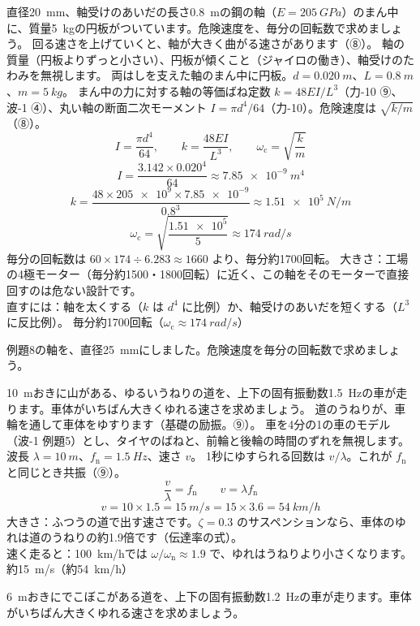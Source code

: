 \label{ph:波-2:ex8}
\begin{phreidai}[回る軸の危険速度]
直径\qty{20}{mm}、軸受けのあいだの長さ\qty{0.8}{m}の鋼の軸（$E=\qty{205}{GPa}$）のまん中に、質量\qty{5}{kg}の円板がついています。危険速度を、毎分の回転数で求めましょう。
\phbamen
回る速さを上げていくと、軸が大きく曲がる速さがあります（⑧）。
\phmushi
軸の質量（円板よりずっと小さい）、円板が傾くこと（ジャイロの働き）、軸受けのたわみを無視します。
\phzu
両はしを支えた軸のまん中に円板。$d=\qty{0.020}{m}$、$L=\qty{0.8}{m}$、$m=\qty{5}{kg}$。
\phriyu
まん中の力に対する軸の等価ばね定数 $k=48EI/L^3$（力-10 ⑨、波-1 ④）、丸い軸の断面二次モーメント $I=\pi d^4/64$（力-10）。危険速度は $\sqrt{k/m}$（⑧）。
\phtateru
\[I=\frac{\pi d^4}{64},\qquad k=\frac{48EI}{L^3},\qquad \omega_{\mathrm c}=\sqrt{\frac{k}{m}}\]
\phtoku
\[I=\frac{3.142\times0.020^4}{64}\approx\qty{7.85e-9}{m^4}\]
\[k=\frac{48\times\num{205e9}\times\num{7.85e-9}}{0.8^3}\approx\qty{1.51e5}{N/m}\]
\[\omega_{\mathrm c}=\sqrt{\frac{\num{1.51e5}}{5}}\approx\qty{174}{rad/s}\]
毎分の回転数は $60\times174\div6.283\approx1660$ より、毎分約1700回転。
\phtashikame
大きさ：工場の4極モーター（毎分約1500・1800回転）に近く、この軸をそのモーターで直接回すのは危ない設計です。\\
直すには：軸を太くする（$k$ は $d^4$ に比例）か、軸受けのあいだを短くする（$L^3$ に反比例）。
\kotae 毎分約1700回転（$\omega_{\mathrm c}\approx\qty{174}{rad/s}$）
\end{phreidai}
\begin{jibun}
例題8の軸を、直径\qty{25}{mm}にしました。危険速度を毎分の回転数で求めましょう。
\end{jibun}

\label{ph:波-2:ex9}
\begin{phreidai}[うねりのある道の危ない速さ]
\qty{10}{m}おきに山がある、ゆるいうねりの道を、上下の固有振動数\qty{1.5}{Hz}の車が走ります。車体がいちばん大きくゆれる速さを求めましょう。
\phbamen
道のうねりが、車輪を通して車体をゆすります（基礎の励振。⑨）。
\phmushi
車を4分の1の車のモデル（波-1 例題5）とし、タイヤのばねと、前輪と後輪の時間のずれを無視します。
\phzu
波長 $\lambda=\qty{10}{m}$、$f_{\mathrm n}=\qty{1.5}{Hz}$、速さ $v$。
\phriyu
1秒にゆすられる回数は $v/\lambda$。これが $f_{\mathrm n}$ と同じとき共振（⑨）。
\phtateru
\[\frac{v}{\lambda}=f_{\mathrm n}\qquad v=\lambda f_{\mathrm n}\]
\phtoku
\[v=10\times1.5=\qty{15}{m/s}=15\times3.6=\qty{54}{km/h}\]
\phtashikame
大きさ：ふつうの道で出す速さです。$\zeta=0.3$ のサスペンションなら、車体のゆれは道のうねりの約1.9倍です（伝達率の式）。\\
速く走ると：\qty{100}{km/h}では $\omega/\omega_{\mathrm n}\approx1.9$ で、ゆれはうねりより小さくなります。
\kotae 約\qty{15}{m/s}（約\qty{54}{km/h}）
\end{phreidai}
\begin{jibun}
\qty{6}{m}おきにでこぼこがある道を、上下の固有振動数\qty{1.2}{Hz}の車が走ります。車体がいちばん大きくゆれる速さを求めましょう。
\end{jibun}

